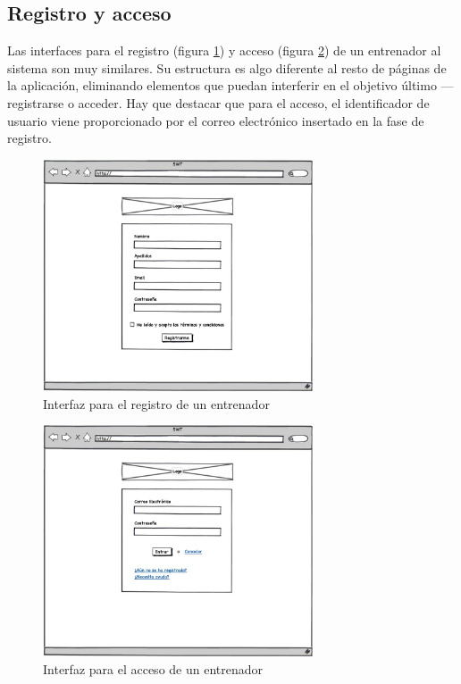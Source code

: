 	
	\subsection{Registro y acceso} %
		\label{sub:registro_y_acceso}
	
		Las interfaces para el registro (figura \ref{fig:interfaz_registro}) y acceso (figura \ref{fig:interfaz_acceso}) de un entrenador al sistema son muy similares. Su estructura es algo diferente al resto de páginas de la aplicación, eliminando elementos que puedan interferir en el objetivo último ---registrarse o acceder. Hay que destacar que para el acceso, el identificador de usuario viene proporcionado por el correo electrónico insertado en la fase de registro.
		
		\begin{figure}[H]
		  \centering
		    \includegraphics[width=8cm]{./eps/4_Registro.eps}
		  \caption{Interfaz para el registro de un entrenador}
		  \label{fig:interfaz_registro}
		\end{figure}
		
		\begin{figure}[H]
		  \centering
		    \includegraphics[width=8cm]{./eps/5_Acceder.eps}
		  \caption{Interfaz para el acceso de un entrenador}
		  \label{fig:interfaz_acceso}
		\end{figure}
	
